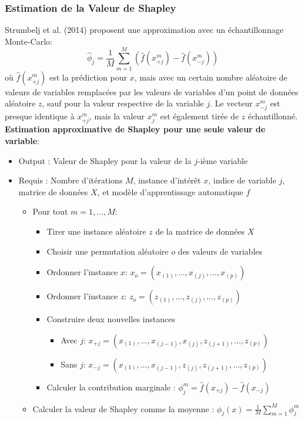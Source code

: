 \subsubsection{Estimation de la Valeur de Shapley}
Strumbelj et al. (2014) proposent une approximation avec un échantillonnage Monte-Carlo:
\[
\hat{\phi}_{j}=\frac{1}{M}\sum_{m=1}^{M}\left(\hat{f}(x^{m}_{+j})-\hat{f}(x^{m}_{-j})\right)
\]
où \( \hat{f}(x^{m}_{+j}) \) est la prédiction pour \( x \), mais avec un certain nombre aléatoire de valeurs de variables remplacées par les valeurs de variables d'un point de données aléatoire \( z \), sauf pour la valeur respective de la variable \( j \).
Le vecteur \( x^{m}_{-j} \) est presque identique à \( x^{m}_{+j} \), mais la valeur \( x_j^{m} \) est également tirée de \( z \) échantillonné.
\\
\textbf{Estimation approximative de Shapley pour une seule valeur de variable}:
\begin{itemize}
  \item Output : Valeur de Shapley pour la valeur de la \( j \)-ième variable
  \item Requis : Nombre d'itérations \( M \), instance d'intérêt \( x \), indice de variable \( j \), matrice de données \( X \), et modèle d'apprentissage automatique \( f \)
  \begin{itemize}
    \item Pour tout \( m = 1,...,M \):
    \begin{itemize}
      \item Tirer une instance aléatoire \( z \) de la matrice de données \( X \)
      \item Choisir une permutation aléatoire \( o \) des valeurs de variables
      \item Ordonner l'instance \( x \): \( x_o = (x_{(1)},\ldots,x_{(j)},\ldots,x_{(p)}) \)
      \item Ordonner l'instance \( z \): \( z_o = (z_{(1)},\ldots,z_{(j)},\ldots,z_{(p)}) \)
      \item Construire deux nouvelles instances
      \begin{itemize}
        \item Avec \( j \): \( x_{+j} = (x_{(1)},\ldots,x_{(j-1)},x_{(j)},z_{(j+1)},\ldots,z_{(p)}) \)
        \item Sans \( j \): \( x_{-j} = (x_{(1)},\ldots,x_{(j-1)},z_{(j)},z_{(j+1)},\ldots,z_{(p)}) \)
      \end{itemize}
      \item Calculer la contribution marginale : \( \phi_j^{m}=\hat{f}(x_{+j})-\hat{f}(x_{-j}) \)
    \end{itemize}
    \item Calculer la valeur de Shapley comme la moyenne : \( \phi_j(x)=\frac{1}{M}\sum_{m=1}^{M}\phi_j^{m} \)
  \end{itemize}
\end{itemize}

